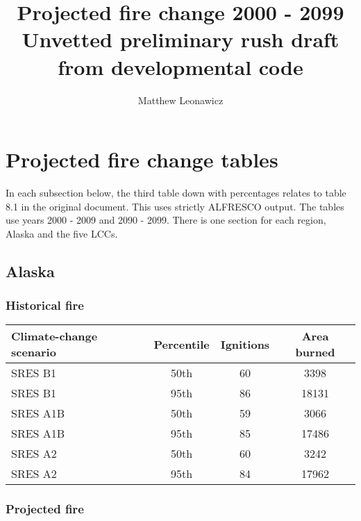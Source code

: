 \documentclass{article}\usepackage[]{graphicx}\usepackage[]{color}
\newcommand{\headcol}{\rowcolor{tableheadcolor}}
\begin{document}
\title{Projected fire change 2000 - 2099 \\ \large Unvetted preliminary rush draft from developmental code}
\author{Matthew Leonawicz}
\maketitle

\setlength{\aboverulesep}{0.2pt}
\setlength{\belowrulesep}{0.2pt}



\section{Projected fire change tables}
In each subsection below, the third table down with percentages relates to table 8.1 in the original document.
This uses strictly ALFRESCO output.
The tables use years 2000 - 2009 and 2090 - 2099.
There is one section for each region, Alaska and the five LCCs.


\subsection{Alaska}
\subsubsection{Historical fire}

\begin{table}[ht]
\centering
\begin{tabular}{lccc}
  \headcol 
 \toprule
Climate-change scenario & Percentile & Ignitions & Area burned \\ 
  \midrule
SRES B1 & 50th & 60 & 3398 \\ 
  SRES B1 & 95th & 86 & 18131 \\ 
  SRES A1B & 50th & 59 & 3066 \\ 
  SRES A1B & 95th & 85 & 17486 \\ 
  SRES A2 & 50th & 60 & 3242 \\ 
  SRES A2 & 95th & 84 & 17962 \\ 
   \bottomrule
\end{tabular}
\end{table}


\subsubsection{Projected fire}
\end{document}
